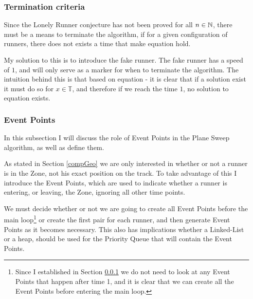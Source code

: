 \subsubsection{Termination criteria}
\label{termination}
Since the Lonely Runner conjecture has not been proved for all $n \in \mathbb{N}$, there must be a means to terminate the algorithm, if for a given configuration of runners, there does not exists a time that make equation  hold.

My solution to this is to introduce the fake runner. The fake runner has a speed of $1$, and will only serve as a marker for when to terminate the algorithm. The intuition behind this is that based on equation  - it is clear that if a solution exist it must do so for $x \in \mathbb{T}$, and therefore if we reach the time $1$, no solution to equation  exists.

\subsubsection{Event Points}
\label{eventPoints}
In this subsection I will discuss the role of Event Points in the Plane Sweep algorithm, as well as define them. 

As stated in Section \ref{compGeo} we are only interested in whether or not a runner is in the Zone, not his exact position on the track. To take advantage of this I introduce the Event Points, which are used to indicate whether a runner is entering, or leaving, the Zone, ignoring all other time points. 

We must decide whether or not we are going to create all Event Points before the main loop\footnote{Since I established in Section \ref{termination} we do not need to look at any Event Points that happen after time 1, and it is clear that we can create all the Event Points before entering the main loop.} or create the first pair for each runner, and then generate Event Points as it becomes necessary. This also has implications whether a Linked-List or a heap, should be used for the Priority Queue that will contain the Event Points. 

